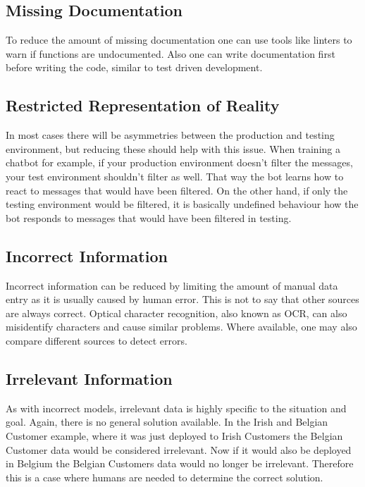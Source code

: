 
\subsection{Missing Documentation}
To reduce the amount of missing documentation
one can use tools like linters to warn if 
functions are undocumented. Also one can write documentation 
first before writing the code, similar to test driven development.


\subsection{Restricted Representation of Reality}
In most cases there will  be asymmetries between the production and testing environment, but reducing these should help with this issue. 
When training a chatbot for example, if your production environment doesn't filter the messages, your test environment shouldn't filter as well.
That way the bot learns how to react to messages that would have been filtered. 
On the other hand, if only the testing environment would be filtered, it is basically undefined behaviour how the bot responds to messages that would have been filtered in testing.

\subsection{Incorrect Information}
Incorrect information can be reduced by limiting 
the amount of manual data entry as it is usually caused by human error. This is not to say that other sources are
always correct. Optical character recognition, also known as OCR, can 
also misidentify characters and cause similar problems.
Where available, one may also compare different sources to detect errors.

\subsection{Irrelevant Information}
As with incorrect models, irrelevant data is highly specific to the situation and goal. Again, there is no general solution available.
In the Irish and Belgian Customer example, where it was just deployed to Irish Customers the Belgian Customer data would be considered irrelevant.
Now if it would also be deployed in Belgium the Belgian Customers data would no longer be irrelevant.
Therefore this is a case where humans are needed to determine the correct solution.

